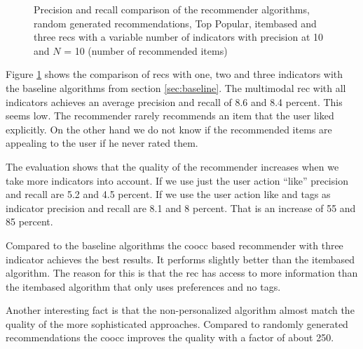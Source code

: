 \pgfplotsset{width=7cm}
\begin{figure}
  \centering
{} 
\caption{Precision and recall comparison of the recommender algorithms, random generated recommendations, Top Popular, itembased  and three \glspl{rec} with a variable number of indicators with precision at 10 and $N$ = 10 (number of recommended items)}
  \label{fig:precisionrecallvalues}
\end{figure}

Figure \ref{fig:precisionrecallvalues} shows the comparison of \glspl{rec} with one, two and three indicators with the baseline algorithms from section \ref{sec:baseline}.
The multimodal \gls{rec} with all indicators achieves an average precision and recall of 8.6 and 8.4 percent. This seems low. The recommender rarely recommends an item that the user liked explicitly. On the other hand we do not know if the recommended items are appealing to the user if he never rated them.

The evaluation shows that the quality of the recommender increases when we take more indicators into account. If we use just the user action ``like'' precision and recall are 5.2 and 4.5 percent. If we use the user action like and \glspl{tag} as indicator precision and recall are  8.1 and 8 percent. That is an increase of 55 and 85 percent.

Compared to the baseline algorithms the \gls{coocc} based recommender with three indicator achieves the best results. It performs slightly better than the \gls{itembased} algorithm. The reason for this is that the \gls{rec} has access to more information than the \gls{itembased} algorithm that only uses preferences and no tags.

Another interesting fact is that the non-personalized algorithm almost match the quality of the more sophisticated approaches. Compared to randomly generated recommendations the \gls{coocc} improves the quality with a factor of about 250.
